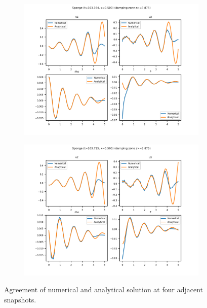 \documentclass[dvipsnames]{beamer}
\begin{document}
\begin{frame}
\begin{figure}[!h]
        \begin{subfigure}{0.4\textwidth}
            \centering
            \includegraphics[width=\textwidth]{../sims/2d_strat/agree_plots/sponge_2.png}
        \end{subfigure}
        \begin{subfigure}{0.4\textwidth}
            \centering
            \includegraphics[width=\textwidth]{../sims/2d_strat/agree_plots/sponge_3.png}
        \end{subfigure}
        \caption{Agreement of numerical and analytical solution at four adjacent
        snapshots.}\label{fig:sponge_agree}
    \end{figure}
\end{frame}
\end{document}
